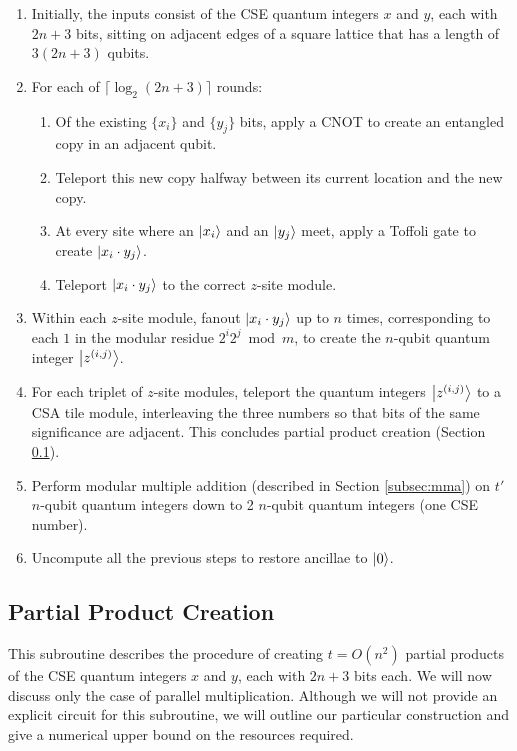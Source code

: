 \begin{enumerate}
\item Initially, the inputs consist of the CSE quantum integers $x$ and $y$,
each with $2n+3$ bits, sitting on adjacent edges of a square lattice that has
a length of $3(2n+3)$ qubits.
\item For each of $\lceil \log_2 (2n+3) \rceil$ rounds:
\begin{enumerate}
\item Of the existing $\{x_i\}$ and $\{y_j\}$ bits, apply a CNOT to create an
entangled copy in an adjacent qubit.
\item Teleport this new copy halfway between its current location and the
new copy.
\item At every site where an $\left\vert{x_i}\right\rangle$ and an $\left\vert{y_j}\right\rangle$ meet,
apply a Toffoli gate to create $\left\vert{x_i \cdot y_j}\right\rangle$.
\item Teleport $\left\vert{x_i \cdot y_j}\right\rangle$ to the correct $z$-site module.
\end{enumerate}
\item Within each $z$-site module, fanout $\left\vert{x_i \cdot y_j}\right\rangle$ up to $n$
times, corresponding to each $1$ in the modular residue $2^i 2^j \bmod m$,
to create the $n$-qubit quantum integer $\left\vert{z^{(i,j)}}\right\rangle$.
\item For each triplet of $z$-site modules, teleport the quantum integers
$\left\vert{z^{(i,j)}}\right\rangle$ to a CSA tile module, interleaving the three numbers so that
bits of the same significance are adjacent. This concludes partial product
creation (Section \ref{subsec:ppc}).
\item Perform modular multiple addition (described in Section \ref{subsec:mma})
on $t'$ $n$-qubit quantum integers down to 2 $n$-qubit quantum integers (one CSE number).
\item Uncompute all the previous steps to restore ancillae to $\left\vert{0}\right\rangle$.
\end{enumerate}
\subsection{Partial Product Creation}
\label{subsec:ppc}

This subroutine describes the procedure of creating $t=O(n^2)$ partial products of
the CSE quantum integers $x$ and $y$, each with $2n+3$ bits each. We will now
discuss only the case of parallel multiplication. Although we
will not provide an explicit circuit for this subroutine, we will outline
our particular construction and give a numerical upper bound on the
resources required.

